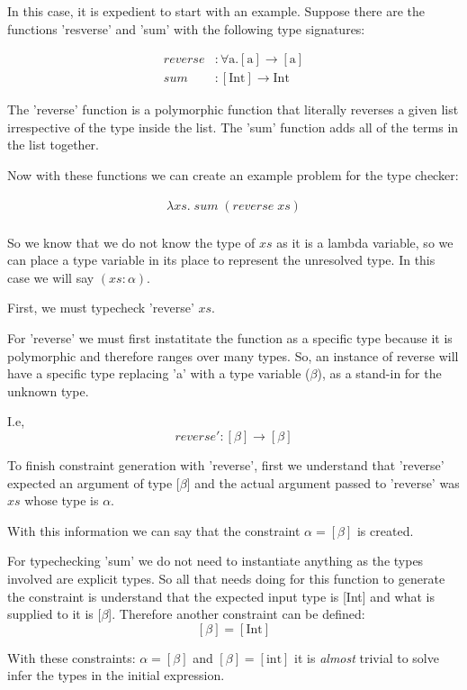 \documentclass{l4proj}
\begin{document}
In this case, it is expedient to start with an example.
Suppose there are the functions 'resverse' and 'sum' with the following type signatures:

\begin{align*}
    \mathit{reverse} &: \forall \text{a} . [\text{a}] \rightarrow [\text{a}] \\
    \mathit{sum} &: [\text{Int}] \rightarrow \text{Int}
\end{align*}

The 'reverse' function is a polymorphic function that literally reverses a given list irrespective of the type inside the list.
The 'sum' function adds all of the terms in the list together.

Now with these functions we can create an example problem for the type checker:

\begin{align*}
    \lambda xs . \; \mathit{sum} \; (\mathit{reverse} \; xs) \\
\end{align*}

So we know that we do not know the type of $xs$ as it is a lambda variable, so we can place a type variable in its place to represent the unresolved type.
In this case we will say $(xs : \alpha)$.

First, we must typecheck 'reverse' $xs$.

For 'reverse' we must first instatitate the function as a specific type because it is polymorphic and therefore ranges over many types.
So, an instance of reverse will have a specific type replacing 'a' with a type variable ($\beta$), as a stand-in for the unknown type.

I.e, \[reverse' : [\beta] \rightarrow [\beta]\]


To finish constraint generation with 'reverse', first we understand that 'reverse' expected an argument of type [$\beta$] and the actual argument passed to 'reverse' was $xs$ whose type is $\alpha$.

With this information we can say that the constraint $\alpha = [\beta]$ is created.

For typechecking 'sum' we do not need to instantiate anything as the types involved are explicit types.
So all that needs doing for this function to generate the constraint is understand that the expected input type is [Int] and what is supplied to it is [$\beta$].
Therefore another constraint can be defined:
\[[\beta] = [\text{Int}]\]

With these constraints: $\alpha = [\beta]$ and $[\beta] = [\text{int}]$ it is \emph{almost} trivial to solve infer the types in the initial expression.
\end{document}
